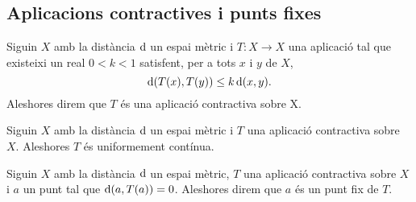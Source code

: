 \documentclass[../Apunts.tex]{subfiles}
\begin{document}
	\subsection{Aplicacions contractives i punts fixes}
	\begin{definition}
		\label{def:aplicació contractiva}
		Siguin \(X\) amb la distància \(\operatorname{d}\) un espai mètric i \(T\colon X\longrightarrow X\) una aplicació tal que existeixi un real \(0<k<1\) satisfent, per a tots \(x\) i \(y\) de \(X\),
		\[\operatorname{d}(T(x),T(y))\leq k\operatorname{d}(x,y).\]
		Aleshores direm que \(T\) és una aplicació contractiva sobre X.
	\end{definition}
	\begin{observation}
		\label{obs:les aplicacions contractives són uniformement contínues}
		Siguin \(X\) amb la distància \(\operatorname{d}\) un espai mètric i \(T\) una aplicació contractiva sobre \(X\). Aleshores \(T\) és uniformement contínua.
	\end{observation}
	\begin{definition}
		\label{def:punt fix d'un aplicació contractiva}
		Siguin \(X\) amb la distància \(\operatorname{d}\) un espai mètric, \(T\) una aplicació contractiva sobre \(X\) i \(a\) un punt tal que \(\operatorname{d}(a,T(a))=0\). Aleshores direm que \(a\) és un punt fix de \(T\).
	\end{definition}
\end{document}
